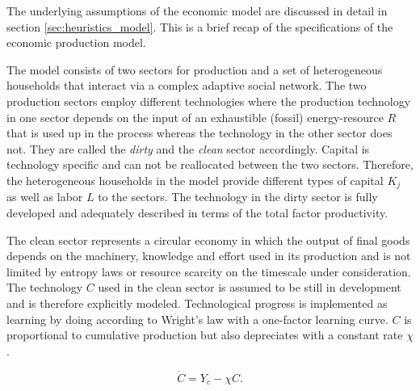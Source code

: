 The underlying assumptions of the economic model are discussed in detail in section \ref{sec:heuristics_model}. This is a brief recap of the specifications of the economic production model. 

The model consists of two sectors for production and a set of heterogeneous households that interact via a complex adaptive social network. The two production sectors employ different technologies where the production technology in one sector depends on the input of an exhaustible (fossil) energy-resource $R$ that is used up in the process whereas the technology in the other sector does not. They are called the \textit{dirty} and the \textit{clean} sector accordingly. Capital is technology specific and can not be reallocated between the two sectors.
Therefore, the heterogeneous households in the model provide different types of capital $K_j$ as well as labor $L$ to the sectors.
The technology in the dirty sector is fully developed and adequately described in terms of the total factor productivity. 

The clean sector represents a circular economy in which the output of final goods depends on the machinery, knowledge and effort used in its production and is not limited by entropy laws or resource scarcity on the timescale under consideration. The technology $C$ used in the clean sector is assumed to be still in development and is therefore explicitly modeled.
Technological progress is implemented as learning by doing according to Wright's law \citep{wright1936factors, Nagy2013} with a one-factor learning curve. $C$ is proportional to cumulative production but also depreciates with a constant rate $\chi$.

\begin{equation}
	\dot{C} = Y_c - \chi C.
	\label{eq:approx_lbd}
\end{equation}

